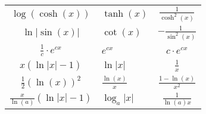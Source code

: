 \begin{center}
\begin{tabularx}{\linewidth}{c>{\centering\arraybackslash}Xc}
    $\log(\cosh(x))$                       & $\tanh(x)$               & $\frac{1}{\cosh^2(x)}$   \\
    $\ln | \sin(x)|$                       & $\cot(x)$                & $-\frac{1}{\sin^2(x)}$   \\
    $\frac{1}{c} \cdot e^{cx}$             & $e^{cx}$                 & $c \cdot e^{cx}$         \\
    $x(\ln |x| - 1)$                       & $\ln |x|$                & $\frac{1}{x}$            \\
    $\frac{1}{2}(\ln(x))^2$                & $\frac{\ln(x)}{x}$       & $\frac{1 - \ln(x)}{x^2}$ \\
    $\frac{x}{\ln(a)} (\ln|x| -1)$         & $\log_a |x|$             & $\frac{1}{\ln(a)x}$      \\

  \end{tabularx}
\end{center}

